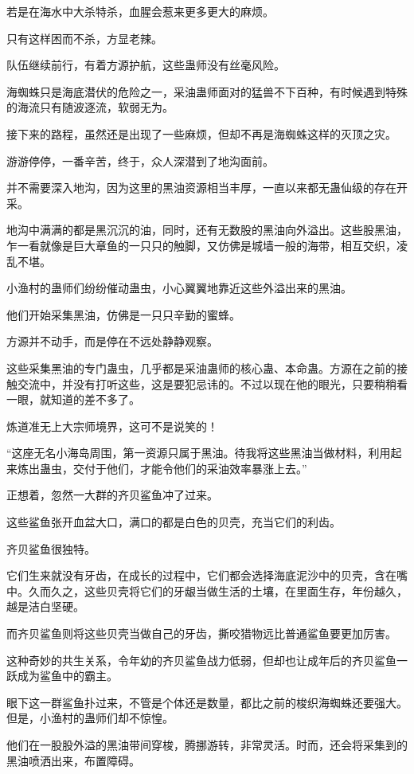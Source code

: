\begin{this_body}
若是在海水中大杀特杀，血腥会惹来更多更大的麻烦。

只有这样困而不杀，方显老辣。

队伍继续前行，有着方源护航，这些蛊师没有丝毫风险。

海蜘蛛只是海底潜伏的危险之一，采油蛊师面对的猛兽不下百种，有时候遇到特殊的海流只有随波逐流，软弱无为。

接下来的路程，虽然还是出现了一些麻烦，但却不再是海蜘蛛这样的灭顶之灾。

游游停停，一番辛苦，终于，众人深潜到了地沟面前。

并不需要深入地沟，因为这里的黑油资源相当丰厚，一直以来都无蛊仙级的存在开采。

地沟中满满的都是黑沉沉的油，同时，还有无数股的黑油向外溢出。这些股黑油，乍一看就像是巨大章鱼的一只只的触脚，又仿佛是城墙一般的海带，相互交织，凌乱不堪。

小渔村的蛊师们纷纷催动蛊虫，小心翼翼地靠近这些外溢出来的黑油。

他们开始采集黑油，仿佛是一只只辛勤的蜜蜂。

方源并不动手，而是停在不远处静静观察。

这些采集黑油的专门蛊虫，几乎都是采油蛊师的核心蛊、本命蛊。方源在之前的接触交流中，并没有打听这些，这是要犯忌讳的。不过以现在他的眼光，只要稍稍看一眼，就知道的差不多了。

炼道准无上大宗师境界，这可不是说笑的！

“这座无名小海岛周围，第一资源只属于黑油。待我将这些黑油当做材料，利用起来炼出蛊虫，交付于他们，才能令他们的采油效率暴涨上去。”

正想着，忽然一大群的齐贝鲨鱼冲了过来。

这些鲨鱼张开血盆大口，满口的都是白色的贝壳，充当它们的利齿。

齐贝鲨鱼很独特。

它们生来就没有牙齿，在成长的过程中，它们都会选择海底泥沙中的贝壳，含在嘴中。久而久之，这些贝壳将它们的牙龈当做生活的土壤，在里面生存，年份越久，越是洁白坚硬。

而齐贝鲨鱼则将这些贝壳当做自己的牙齿，撕咬猎物远比普通鲨鱼要更加厉害。

这种奇妙的共生关系，令年幼的齐贝鲨鱼战力低弱，但却也让成年后的齐贝鲨鱼一跃成为鲨鱼中的霸主。

眼下这一群鲨鱼扑过来，不管是个体还是数量，都比之前的梭织海蜘蛛还要强大。但是，小渔村的蛊师们却不惊惶。

他们在一股股外溢的黑油带间穿梭，腾挪游转，非常灵活。时而，还会将采集到的黑油喷洒出来，布置障碍。


\end{this_body}
